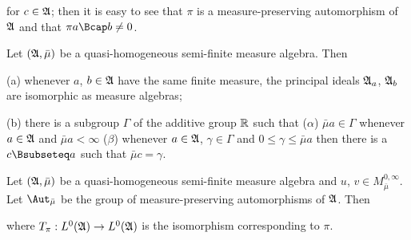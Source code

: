 {

\noindent for $c\in\frak A$;
then it is easy to see that $\pi$ is a measure-preserving
automorphism of $\frak A$ and that $\pi a\Bcap b\ne 0$.
}%


 Let $(\frak A,\bar\mu)$ be a quasi-homogeneous
semi-finite measure algebra.   Then

(a) whenever $a$, $b\in\frak A$ have the same finite measure, the
principal ideals $\frak A_a$, $\frak A_b$ are isomorphic as measure
algebras;

(b) there is a subgroup $\Gamma$ of the additive group $\Bbb R$ such
that ($\alpha$) $\bar\mu a\in\Gamma$ whenever $a\in\frak A$ and
$\bar\mu a<\infty$ ($\beta$) whenever $a\in\frak A$, $\gamma\in\Gamma$
and $0\le\gamma\le\bar\mu a$ then there is a $c\Bsubseteq a$ such that
$\bar\mu c=\gamma$.


 Let $(\frak A,\bar\mu)$ be a quasi-homogeneous
semi-finite measure algebra and $u$,
$v\in M^{0,\infty}_{\bar\mu}$.   Let $\Aut_{\bar\mu}$ be the group
of measure-preserving automorphisms of $\frak A$.   Then


\noindent where $T_{\pi}:L^0(\frak A)\to L^0(\frak A)$ is the
isomorphism corresponding to $\pi$.

